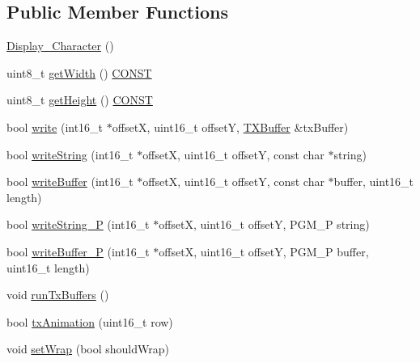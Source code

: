 \subsection*{Public Member Functions}
\begin{DoxyCompactItemize}
\item 
\hyperlink{classflame_1_1_display___character_af56156cb749caf92093c7851a8cc9412}{Display\-\_\-\-Character} ()
\item 
uint8\-\_\-t \hyperlink{classflame_1_1_display___character_a8945b725b35dc3ccb960be48defa04d6}{get\-Width} () \hyperlink{io_8h_a0c33b494a68ce28497e7ce8e5e95feff}{C\-O\-N\-S\-T}
\item 
uint8\-\_\-t \hyperlink{classflame_1_1_display___character_a1e43e42391796d83cb12dfc57469f1da}{get\-Height} () \hyperlink{io_8h_a0c33b494a68ce28497e7ce8e5e95feff}{C\-O\-N\-S\-T}
\item 
bool \hyperlink{classflame_1_1_display___character_a29583da1ca8a9b1ab48982d97828ff18}{write} (int16\-\_\-t $\ast$offset\-X, uint16\-\_\-t offset\-Y, \hyperlink{classflame_1_1_t_x_buffer}{T\-X\-Buffer} \&tx\-Buffer)
\item 
bool \hyperlink{classflame_1_1_display___character_aca5ba0e9806ba7296f847f2f4bb8711e}{write\-String} (int16\-\_\-t $\ast$offset\-X, uint16\-\_\-t offset\-Y, const char $\ast$string)
\item 
bool \hyperlink{classflame_1_1_display___character_a909a1a46c1072748a596c260c664f127}{write\-Buffer} (int16\-\_\-t $\ast$offset\-X, uint16\-\_\-t offset\-Y, const char $\ast$buffer, uint16\-\_\-t length)
\item 
bool \hyperlink{classflame_1_1_display___character_ab11d4562a0b93afcf5b41c43d0bb7d45}{write\-String\-\_\-\-P} (int16\-\_\-t $\ast$offset\-X, uint16\-\_\-t offset\-Y, P\-G\-M\-\_\-\-P string)
\item 
bool \hyperlink{classflame_1_1_display___character_a382ee6d2e408b55277c8f9638a7eb2cc}{write\-Buffer\-\_\-\-P} (int16\-\_\-t $\ast$offset\-X, uint16\-\_\-t offset\-Y, P\-G\-M\-\_\-\-P buffer, uint16\-\_\-t length)
\item 
void \hyperlink{classflame_1_1_display___character_a4a3172da51cdb598217654934f9a2ae4}{run\-Tx\-Buffers} ()
\item 
bool \hyperlink{classflame_1_1_display___character_a74858e6aa4ba6205047f1dbd03544ece}{tx\-Animation} (uint16\-\_\-t row)
\item 
void \hyperlink{classflame_1_1_display___character_a53e7bb7086d34b746628b9c9b9cf13c2}{set\-Wrap} (bool should\-Wrap)
\item 

\end{DoxyCompactItemize}
